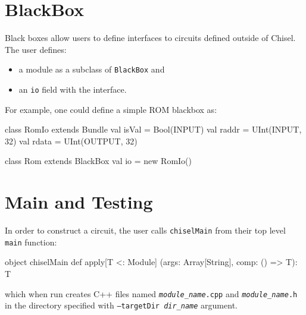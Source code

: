 \documentclass[10pt,twocolumn]{article}
\def\code#1{{\small\tt #1}}
\begin{document}

\section{BlackBox}

Black boxes allow users to define interfaces to circuits defined
outside of Chisel.  The user defines:

\begin{itemize}
\item a module as a subclass of \code{BlackBox} and
\item an \code{io} field with the interface.
\end{itemize}

\noindent
For example, one could define a simple ROM blackbox as:

\begin{scala}
class RomIo extends Bundle {
  val isVal = Bool(INPUT)
  val raddr = UInt(INPUT,  32)
  val rdata = UInt(OUTPUT, 32)
}

class Rom extends BlackBox {
  val io = new RomIo()
}
\end{scala}

\section{Main and Testing}

In order to construct a circuit, 
the user calls \code{chiselMain} from their top level \code{main} function:

\begin{scala}
object chiselMain {
  def apply[T <: Module]
    (args: Array[String], comp: () => T): T
}
\end{scala}

\noindent
which when run creates C++ files named
\code{{\it module\_name}.cpp} and \code{{\it module\_name}.h} in
the directory specified with
\code{--targetDir {\it dir\_name}} argument.
\end{document}
